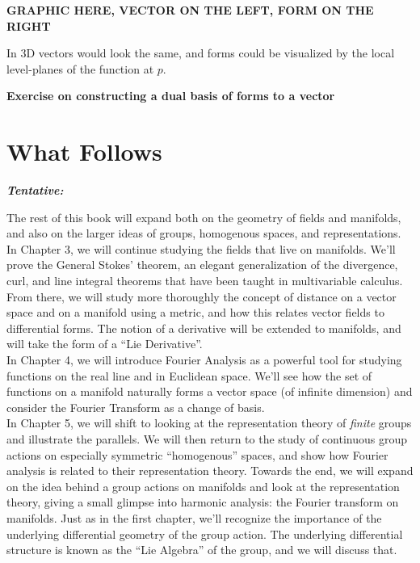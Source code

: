 	\textbf{GRAPHIC HERE, VECTOR ON THE LEFT, FORM ON THE RIGHT}
	
	In $3$D vectors would look the same, and forms could be visualized by the local level-planes of the function at $p$.
	
	\textbf{Exercise on constructing a dual basis of forms to a vector}
	
	
	\section{What Follows} %
	\label{sec:what_follows}
	
	\begin{center}
		\textbf{\emph{{Tentative:}}}\\
	\end{center}
	The rest of this book will expand both on the geometry of fields and manifolds, and also on the larger ideas of groups, homogenous spaces, and representations. \\
	
	In Chapter 3, we will continue studying the fields that live on manifolds. We'll prove the General Stokes' theorem, an elegant generalization of the divergence, curl, and line integral theorems that have been taught in multivariable calculus. From there, we will study more thoroughly the concept of distance on a vector space and on a manifold using a metric, and how this relates vector fields to differential forms. The notion of a derivative will be extended to manifolds, and will take the form of a ``Lie Derivative''.\\
	
	In Chapter 4, we will introduce Fourier Analysis as a powerful tool for studying functions on the real line and in Euclidean space. We'll see how the set of functions on a manifold naturally forms a vector space (of infinite dimension) and consider the Fourier Transform as a change of basis. \\
	
	In Chapter 5, we will shift to looking at the representation theory of \emph{finite} groups and illustrate the parallels. We will then return to the study of continuous group actions on especially symmetric ``homogenous'' spaces, and show how Fourier analysis is related to their representation theory. Towards the end, we will expand on the idea behind a group actions on manifolds and look at the representation theory, giving a small glimpse into harmonic analysis: the Fourier transform on manifolds. Just as in the first chapter, we'll recognize the importance of the underlying differential geometry of the group action. The underlying differential structure is known as the ``Lie Algebra'' of the group, and we will discuss that.\\
	
